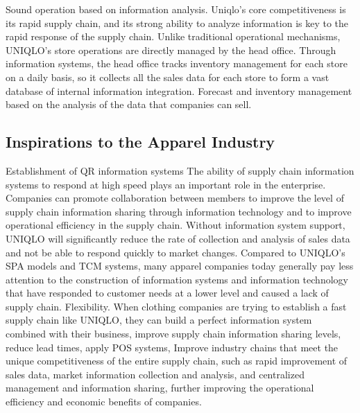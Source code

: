 \documentclass[]{article}
\begin{document}
Sound operation based on information analysis. Uniqlo's core
competitiveness is its rapid supply chain, and its strong ability to
analyze information is key to the rapid response of the supply chain.
Unlike traditional operational mechanisms, UNIQLO's store operations are
directly managed by the head office. Through information systems, the
head office tracks inventory management for each store on a daily basis,
so it collects all the sales data for each store to form a vast database
of internal information integration. Forecast and inventory management
based on the analysis of the data that companies can sell.

\hypertarget{inspirations-to-the-apparel-industry}{%
\subsection{Inspirations to the Apparel
Industry}\label{inspirations-to-the-apparel-industry}}

Establishment of QR information systems The ability of supply chain
information systems to respond at high speed plays an important role in
the enterprise. Companies can promote collaboration between members to
improve the level of supply chain information sharing through
information technology and to improve operational efficiency in the
supply chain. Without information system support, UNIQLO will
significantly reduce the rate of collection and analysis of sales data
and not be able to respond quickly to market changes. Compared to
UNIQLO's SPA models and TCM systems, many apparel companies today
generally pay less attention to the construction of information systems
and information technology that have responded to customer needs at a
lower level and caused a lack of supply chain. Flexibility. When
clothing companies are trying to establish a fast supply chain like
UNIQLO, they can build a perfect information system combined with their
business, improve supply chain information sharing levels, reduce lead
times, apply POS systems, Improve industry chains that meet the unique
competitiveness of the entire supply chain, such as rapid improvement of
sales data, market information collection and analysis, and centralized
management and information sharing, further improving the operational
efficiency and economic benefits of companies.
\end{document}
